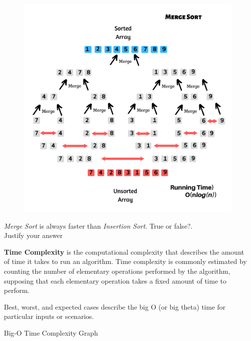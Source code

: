 \documentclass[11pt,fleqn]{book}
\begin{document}
\begin{figure}[H]
    \centering
    \includegraphics[width=150mm]{Pictures/1.pdf}
\end{figure}
\begin{example}
 \textit{Merge Sort} is always faster than \textit{Insertion Sort}.  True or false?. \\ Justify your answer
\end{example}
\begin{definition}
\textbf{Time Complexity} is the computational complexity that describes the amount of time it takes to run an algorithm. Time complexity is commonly estimated by counting the number of elementary operations performed by the algorithm, supposing that each elementary operation takes a fixed amount of time to perform.
\end{definition}
\begin{definition}
Best, worst, and expected cases describe the big O (or big theta) time for particular inputs or scenarios.
\end{definition}
\begin{center}
Big-O Time Complexity Graph
\end{center}
\end{document}
